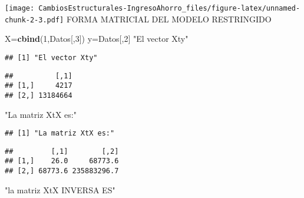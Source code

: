 \documentclass[
]{article}
\newenvironment{Shaded}{\begin{snugshade}}{\end{snugshade}}
\newcommand{\DataTypeTok}[1]{\textcolor[rgb]{0.13,0.29,0.53}{#1}}
\newcommand{\DecValTok}[1]{\textcolor[rgb]{0.00,0.00,0.81}{#1}}
\newcommand{\KeywordTok}[1]{\textcolor[rgb]{0.13,0.29,0.53}{\textbf{#1}}}
\newcommand{\NormalTok}[1]{#1}
\newcommand{\OperatorTok}[1]{\textcolor[rgb]{0.81,0.36,0.00}{\textbf{#1}}}
\newcommand{\StringTok}[1]{\textcolor[rgb]{0.31,0.60,0.02}{#1}}
\begin{document}
\texttt{[image: CambiosEstructurales-IngresoAhorro\_files/figure-latex/unnamed-chunk-2-3.pdf]}
FORMA MATRICIAL DEL MODELO RESTRINGIDO

\begin{Shaded}
\begin{Highlighting}[]
\NormalTok{X=}\KeywordTok{cbind}\NormalTok{(}\DecValTok{1}\NormalTok{,Datos[,}\DecValTok{3}\NormalTok{])}
\NormalTok{y=Datos[,}\DecValTok{2}\NormalTok{]}
\StringTok{"El vector Xty"}
\end{Highlighting}
\end{Shaded}

\begin{verbatim}
## [1] "El vector Xty"
\end{verbatim}

\begin{Shaded}
\end{Shaded}

\begin{verbatim}
##          [,1]
## [1,]     4217
## [2,] 13184664
\end{verbatim}

\begin{Shaded}
\begin{Highlighting}[]
\StringTok{"La matriz XtX es:"}
\end{Highlighting}
\end{Shaded}

\begin{verbatim}
## [1] "La matriz XtX es:"
\end{verbatim}

\begin{Shaded}
\end{Shaded}

\begin{verbatim}
##         [,1]        [,2]
## [1,]    26.0     68773.6
## [2,] 68773.6 235883296.7
\end{verbatim}

\begin{Shaded}
\begin{Highlighting}[]
\StringTok{"la matriz XtX INVERSA ES"}
\end{Highlighting}
\end{Shaded}
\end{document}
